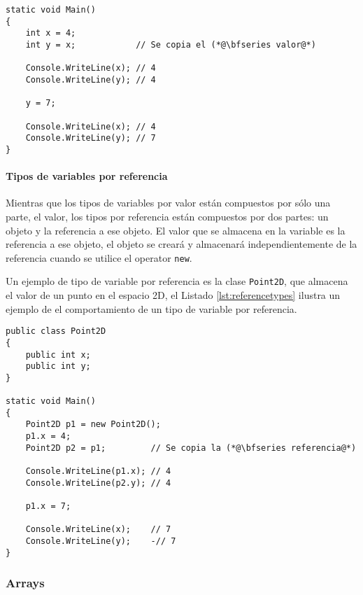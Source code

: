 \documentclass{pre-tfg}
\begin{document}
\begin{spacing}{1}
\begin{lstlisting}[float=htbp, caption=Ejemplo de tipo de variable por valor, label=lst:valuedtypes]
static void Main()
{
	int x = 4;	
	int y = x;            // Se copia el (*@\bfseries valor@*)
	
	Console.WriteLine(x); // 4
	Console.WriteLine(y); // 4
	
	y = 7;
		
	Console.WriteLine(x); // 4
	Console.WriteLine(y); // 7
}
\end{lstlisting}
\end{spacing}

\paragraph{Tipos de variables por referencia}

Mientras que los tipos de variables por valor están compuestos por sólo una parte, el valor, los tipos por referencia están compuestos por dos partes: un objeto y la referencia a ese objeto. El valor que se almacena en la variable es la referencia a ese objeto, el objeto se creará y almacenará independientemente de la referencia cuando se utilice el operator \texttt{new}.

Un ejemplo de tipo de variable por referencia es la clase \texttt{Point2D}, que almacena el valor de un punto en el espacio 2D, el Listado \ref{lst:referencetypes} ilustra un ejemplo de el comportamiento de un tipo de variable por referencia.

\begin{spacing}{1}
\begin{lstlisting}[float=htbp, caption=Ejemplo de tipo de variable por referencia, label=lst:referencetypes]
public class Point2D 
{ 
	public int x;
	public int y;
}

static void Main()
{
	Point2D p1 = new Point2D();
	p1.x = 4;
	Point2D p2 = p1;         // Se copia la (*@\bfseries referencia@*)
	
	Console.WriteLine(p1.x); // 4
	Console.WriteLine(p2.y); // 4
	
	p1.x = 7;
		
	Console.WriteLine(x);    // 7
	Console.WriteLine(y);    -// 7
}
\end{lstlisting}
\end{spacing}

\subsubsection{Arrays}
\end{document}
